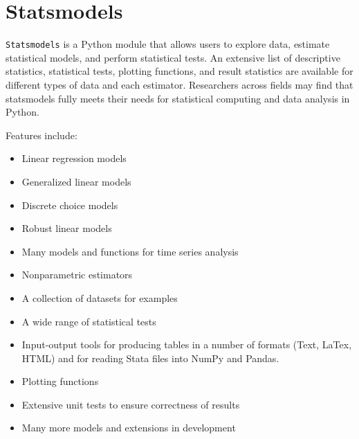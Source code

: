 \documentclass[KSmain.tex]{subfiles}
\begin{document}
\newpage
\section{Statsmodels}
\texttt{Statsmodels} is a Python module that allows users to explore data, estimate statistical models, and perform statistical tests. 
An extensive list of descriptive statistics, statistical tests, plotting functions, and result statistics are available for different types of 
data and each estimator. Researchers across fields may find that statsmodels fully meets their needs for statistical computing and data analysis 
in Python. 

Features include:


\begin{itemize}

\item Linear regression models

\item Generalized linear models

\item Discrete choice models

\item Robust linear models

\item Many models and functions for time series analysis

\item Nonparametric estimators

\item A collection of datasets for examples

\item A wide range of statistical tests

\item Input-output tools for producing tables in a number of formats (Text, LaTex, HTML) and for reading Stata files into NumPy and Pandas.

\item Plotting functions

\item Extensive unit tests to ensure correctness of results

\item Many more models and extensions in development

\end{itemize}
\end{document}
